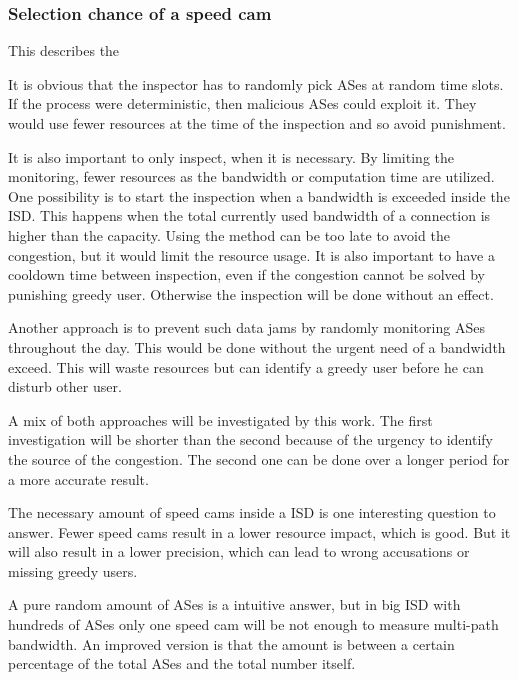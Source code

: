 \documentclass[thesis.tex]{subfiles}
\begin{document}
\subsubsection{Selection chance of a speed cam}
This describes the 

It is obvious that the inspector has to randomly pick ASes at random time slots. If the process were deterministic, then malicious ASes could exploit it. They would use fewer resources at the time of the inspection and so avoid punishment.

It is also important to only inspect, when it is necessary. By limiting the monitoring, fewer resources as the bandwidth or computation time are utilized. One possibility is to start the inspection when a bandwidth is exceeded inside the ISD. This happens when the total currently used bandwidth of a connection is higher than the capacity. Using the method can be too late to avoid the congestion, but it would limit the resource usage. 
It is also important to have a cooldown time between inspection, even if the congestion cannot be solved by punishing greedy user. Otherwise the inspection will be done without an effect.


Another approach is to prevent such data jams by randomly monitoring ASes throughout the day. This would be done without the urgent need of a bandwidth exceed. This will waste resources but can identify a greedy user before he can disturb other user. 

A mix of both approaches will be investigated by this work. The first investigation will be shorter than the second because of the urgency to identify the source of the congestion. The second one can be done over a longer period for a more accurate result.


The necessary amount of speed cams inside a ISD is one interesting question to answer. Fewer speed cams result in a lower resource impact, which is good. But it will also result in a lower precision, which can lead to wrong accusations or missing greedy users.

A pure random amount of ASes is a intuitive answer, but in big ISD with hundreds of ASes only one speed cam will be not enough to measure multi-path bandwidth. An improved version is that the amount is between a certain percentage of the total ASes and the total number itself.
\end{document}

